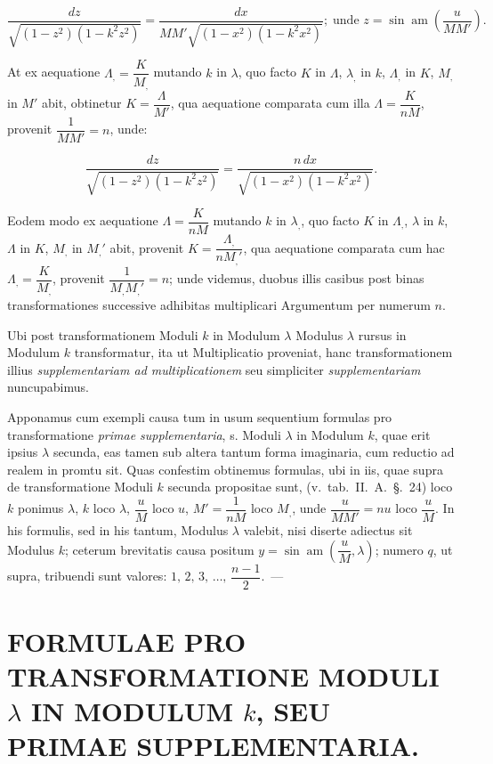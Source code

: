 \documentclass{article}
\begin{document}
\[
\frac{dz}{\sqrt{(1-z^{2})(1-k^{2}z^{2})}}=\frac{dx}{MM'\sqrt{(1-x^{2})(1-k^{2}x^{2})}};\;\text{unde }z=\sin\operatorname{am}\left(\frac{u}{MM'}\right).
\]

At ex aequatione $\Lambda_{,}=\dfrac{K}{M_{,}}$ mutando $k$ in $\lambda$, quo facto $K$ in $\Lambda$, $\lambda_{,}$ in $k$, $\Lambda_{,}$ in $K$, $M_{,}$ in $M'$ abit, obtinetur $K=\dfrac{\Lambda}{M'}$, qua aequatione comparata cum illa $\Lambda=\dfrac{K}{nM}$, provenit $\dfrac{1}{MM'}=n$, unde:

\[
\frac{dz}{\sqrt{(1-z^{2})(1-k^{2}z^{2})}}=\frac{n\,dx}{\sqrt{(1-x^{2})(1-k^{2}x^{2})}}.
\]

Eodem modo ex aequatione $\Lambda=\dfrac{K}{nM}$ mutando $k$ in $\lambda_{,}$, quo facto $K$ in $\Lambda_{,}$, $\lambda$ in $k$, $\Lambda$ in $K$, $M_{,}$ in $M_{,}'$ abit, provenit $K=\dfrac{\Lambda_{,}}{nM_{,}'}$, qua aequatione comparata cum hac $\Lambda_{,}=\dfrac{K}{M_{,}}$, provenit $\dfrac{1}{M_{,}M_{,}'}=n$; unde videmus, duobus illis casibus post binas transformationes successive adhibitas multiplicari Argumentum per numerum $n$.

Ubi post transformationem Moduli $k$ in Modulum $\lambda$ Modulus $\lambda$ rursus in Modulum $k$ transformatur, ita ut Multiplicatio proveniat, hanc transformationem illius \emph{supplementariam ad multiplicationem} seu simpliciter \emph{supplementariam} nuncupabimus.

Apponamus cum exempli causa tum in usum sequentium formulas pro transformatione \emph{primae supplementaria}, s. Moduli $\lambda$ in Modulum $k$, quae erit ipsius $\lambda$ secunda, eas tamen sub altera tantum forma imaginaria, cum reductio ad realem in promtu sit. Quas confestim obtinemus formulas, ubi in iis, quae supra de transformatione Moduli $k$ secunda propositae sunt, (v.\ tab.\ II.\ A.\ §.\ 24) loco $k$ ponimus $\lambda$, $k$ loco $\lambda$, $\dfrac{u}{M}$ loco $u$, $M'=\dfrac{1}{nM}$ loco $M_{,}$, unde $\dfrac{u}{MM'}=nu$ loco $\dfrac{u}{M}$. In his formulis, sed in his tantum, Modulus $\lambda$ valebit, nisi diserte adiectus sit Modulus $k$; ceterum brevitatis causa positum $y=\sin\operatorname{am}\left(\dfrac{u}{M},\lambda\right)$; numero $q$, ut supra, tribuendi sunt valores: $1,\,2,\,3,\,\ldots,\,\dfrac{n-1}{2}$.\ ---

\section*{FORMULAE PRO TRANSFORMATIONE MODULI $\lambda$ IN MODULUM $k$, SEU PRIMAE SUPPLEMENTARIA.}
\end{document}
